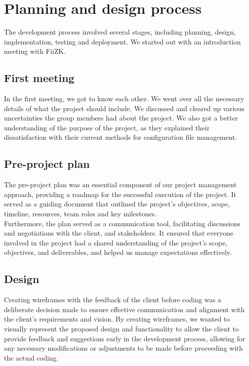 \section{Planning and design process}






The development process involved several stages, including planning, design, implementation, testing and deployment. We started out with an introduction meeting with FiiZK.

\subsection{First meeting}
In the first meeting, we got to know each other. We went over all the necessary details of what the project should include. We discussed and cleared up various uncertainties the group members had about the project. We also got a better understanding of the purpose of the project, as they explained their dissatisfaction with their current methods for configuration file management.


\subsection{Pre-project plan}

The pre-project plan was an essential component of our project management approach, providing a roadmap for the successful execution of the project. It served as a guiding document that outlined the project's objectives, scope, timeline, resources, team roles and key milestones. \\

\noindent
Furthermore, the plan served as a communication tool, facilitating discussions and negotiations with the client, and stakeholders. It ensured that everyone involved in the project had a shared understanding of the project's scope, objectives, and deliverables, and helped us manage expectations effectively.  



\subsection{Design}

Creating wireframes with the feedback of the client before coding was a deliberate decision made to ensure effective communication and alignment with the client's requirements and vision. By creating wireframes, we wanted to visually represent the proposed design and functionality to allow the client to provide feedback and suggestions early in the development process, allowing for any necessary modifications or adjustments to be made before proceeding with the actual coding. 


